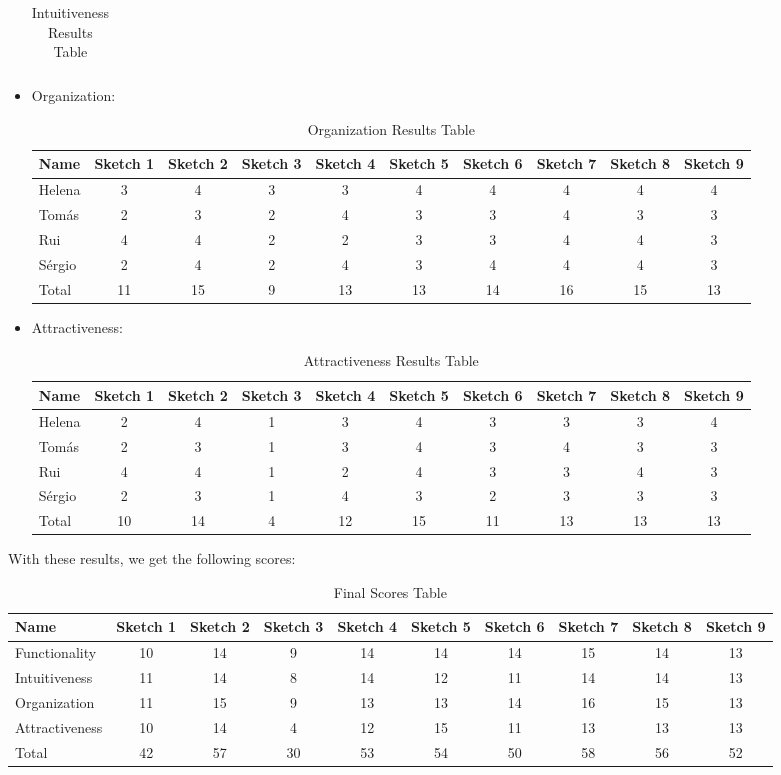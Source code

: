 \begin{itemize}
\begin{table}[H]
\begin{tabular}{l*{9}{c}}
\end{tabular}
\caption{Intuitiveness Results Table}
\end{table}
\item Organization:
\begin{table}[H]
    \begin{tabular}{l*{9}{c}}
        Name & Sketch 1 & Sketch 2 & Sketch 3 & Sketch 4 
        & Sketch 5 & Sketch 6 & Sketch 7 & Sketch 8 & Sketch 9 \\
        \hline 
        Helena & 3 & 4 & 3 & 3 & 4 & 4 & 4 & 4 & 4 \\
        Tomás & 2 & 3 & 2 & 4 & 3 & 3 & 4 & 3 & 3 \\ 
        Rui & 4 & 4 & 2 & 2 & 3 & 3 & 4 & 4 & 3 \\ 
        Sérgio & 2 & 4 & 2 & 4 & 3 & 4 & 4 & 4 & 3 \\ 
        Total & 11 & 15 & 9 & 13 & 13 & 14 & 16 & 15 & 13 \\
    \end{tabular}
    \caption{Organization Results Table}
\end{table}
\item Attractiveness: 
\begin{table}[H]
    \begin{tabular}{l*{9}{c}}
        Name & Sketch 1 & Sketch 2 & Sketch 3 & Sketch 4 
        & Sketch 5 & Sketch 6 & Sketch 7 & Sketch 8 & Sketch 9 \\
        \hline 
        Helena & 2 & 4 & 1 & 3 & 4 & 3 & 3 & 3 & 4 \\
        Tomás & 2 & 3 & 1 & 3 & 4 & 3 & 4 & 3 & 3 \\ 
        Rui & 4 & 4 & 1 & 2 & 4 & 3 & 3 & 4 & 3 \\ 
        Sérgio & 2 & 3 & 1 & 4 & 3 & 2 & 3 & 3 & 3 \\ 
        Total & 10 & 14 & 4 & 12 & 15 & 11 & 13 & 13 & 13 \\
    \end{tabular}
    \caption{Attractiveness Results Table}
\end{table}
\end{itemize}
With these results, we get the following scores: 
\begin{table}[H]
    \begin{tabular}{l*{9}{c}}
        Name & Sketch 1 & Sketch 2 & Sketch 3 & Sketch 4 
        & Sketch 5 & Sketch 6 & Sketch 7 & Sketch 8 & Sketch 9 \\
        \hline 
        Functionality & 10 & 14 & 9 & 14 & 14 & 14 & 15 & 14 & 13 \\
        Intuitiveness & 11 & 14 & 8 & 14 & 12 & 11 & 14 & 14 & 13 \\ 
        Organization & 11 & 15 & 9 & 13 & 13 & 14 & 16 & 15 & 13 \\ 
        Attractiveness & 10 & 14 & 4 & 12 & 15 & 11 & 13 & 13 & 13 \\ 
        Total & 42 & 57 & 30 & 53 & 54 & 50 & 58 & 56 & 52 \\
    \end{tabular}
    \caption{Final Scores Table}
\end{table}
